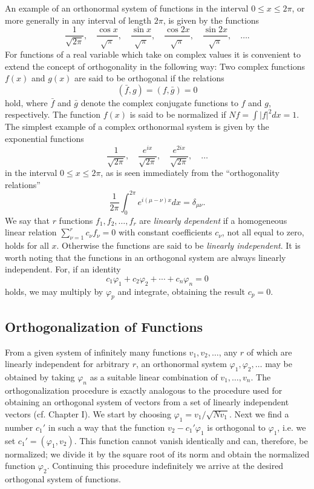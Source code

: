 An example of an orthonormal system of functions in the interval $0\le x\le2\pi$, or more generally in any interval of length $2\pi$, is given by the functions
\[\frac1{\sqrt{2\pi}},\quad\frac{\cos x}{\sqrt\pi},\quad\frac{\sin x}{\sqrt\pi},\quad\frac{\cos2x}{\sqrt\pi},\quad\frac{\sin2x}{\sqrt\pi},\quad\ldots.\]
For functions of a real variable which take on complex values it is convenient to extend the concept of orthogonality in the following way: Two complex functions $f(x)$ and $g(x)$ are said to be orthogonal if the relations
\[(\bar f,g)=(f,\bar g)=0\]
hold, where $\bar f$ and $\bar g$ denote the complex conjugate functions to $f$ and $g$, respectively. The function $f(x)$ is said to be normalized if $Nf=\int|f|^2dx=1$. The simplest example of a complex orthonormal system is given by the exponential functions
\[\frac1{\sqrt{2\pi}},\quad\frac{e^{ix}}{\sqrt{2\pi}},\quad\frac{e^{2ix}}{\sqrt{2\pi}},\quad\ldots\]
in the interval $0\le x\le2\pi$, as is seen immediately from the ``orthogonality relations''
\begin{equation}\frac1{2\pi}\int_0^{2\pi}e^{i(\mu-\nu)x}dx=\delta_{\mu\nu}.\tag{4}\end{equation}
We say that $r$ functions $f_1,f_2,\ldots,f_r$ are \emph{linearly dependent} if a homogeneous linear relation $\sum_{\nu=1}^r c_\nu f_\nu=0$ with constant coefficients $c_\nu$, not all equal to zero, holds for all $x$. Otherwise the functions are said to be \emph{linearly independent}. It is worth noting that the functions in an orthogonal system are always linearly independent. For, if an identity
\[c_1\varphi_1+c_2\varphi_2+\cdots+c_n\varphi_n=0\]
holds, we may multiply by $\varphi_p$ and integrate, obtaining the result $c_p=0$.

\subsection{Orthogonalization of Functions}
From a given system of infinitely many functions $v_1,v_2,\ldots$, any $r$ of which are linearly independent for arbitrary $r$, an orthonormal system $\varphi_1,\varphi_2,\ldots$ may be obtained by taking $\varphi_n$ as a suitable linear combination of $v_1,\ldots,v_n$. The orthogonalization procedure is exactly analogous to the procedure used for obtaining an orthogonal system of vectors from a set of linearly independent vectors (cf. Chapter I). We start by choosing $\varphi_1=v_1/\sqrt{Nv_1}$. Next we find a number $c_1'$ in such a way that the function $v_2-c_1'\varphi_1$ is orthogonal to $\varphi_1$, i.e. we set $c_1'=(\varphi_1,v_2)$. This function cannot vanish identically and can, therefore, be normalized; we divide it by the square root of its norm and obtain the normalized function $\varphi_2$. Continuing this procedure indefinitely we arrive at the desired orthogonal system of functions.

